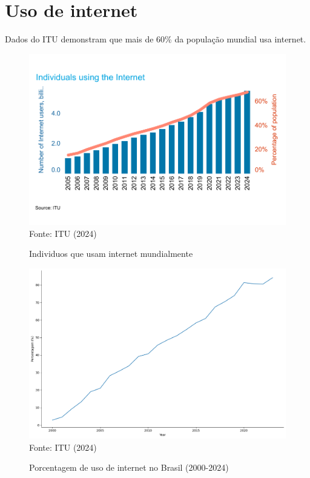 \section{Uso de internet}

Dados do ITU demonstram que mais de 60\% da população mundial usa internet.


\begin{figure}[ht]
    \centering
    \caption{Individuos que usam internet mundialmente}
    \includegraphics[width=1\linewidth]{figuras/uso_internet/individuals_using_internet_itu.png}
    \label{fig:barplot_individuals_using_internet}
    \footnotesize{Fonte: ITU (2024)}
\end{figure}

\begin{figure}[ht]
    \centering
    \caption{Porcentagem de uso de internet no Brasil (2000-2024)}
    \includegraphics[width=1\linewidth]{figuras/uso_internet/uso_internet_brasil_itu.png}
    \label{fig:uso_internet_brasil_itu}
    \footnotesize{Fonte: ITU (2024)}
\end{figure}